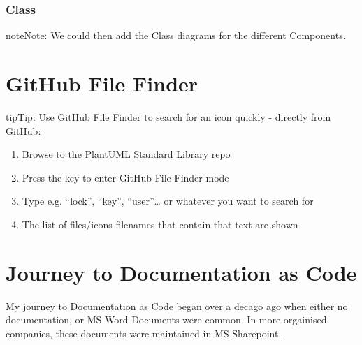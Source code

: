 \documentclass[letterpaper,10pt,english]{sphinxmanual}
\begin{document}
\subsubsection{Class}
\label{\detokenize{C4/C4Stdlib:class}}
\begin{sphinxadmonition}{note}{Note:}
We could then add the Class diagrams for the different Components.
\end{sphinxadmonition}


\section{GitHub File Finder}
\label{\detokenize{github/githubFileFinder:github-file-finder}}\label{\detokenize{github/githubFileFinder:githubfilefinder-label}}\label{\detokenize{github/githubFileFinder::doc}}
\begin{sphinxadmonition}{tip}{Tip:}
Use GitHub File Finder to search for an icon quickly - directly from GitHub:
\begin{enumerate}
%
\item {} 
Browse to the PlantUML Standard Library repo 

\item {} 
Press the  key to enter GitHub File Finder mode

\item {} 
Type e.g. “lock”, “key”, “user”… or whatever you want to search for

\item {} 
The list of files/icons filenames that contain that text are shown

\end{enumerate}

\begin{figure}[H]
\centering

\noindent{}
\end{figure}
\end{sphinxadmonition}


\section{Journey to Documentation as Code}
\label{\detokenize{DocumentationAsCode/JourneyDocumentationASCode:journey-to-documentation-as-code}}\label{\detokenize{DocumentationAsCode/JourneyDocumentationASCode:journeydoc-label}}\label{\detokenize{DocumentationAsCode/JourneyDocumentationASCode::doc}}
My journey to Documentation as Code began over a decago ago when either no documentation, or MS Word Documents were common. In more orgainised companies, these documents were maintained in MS Sharepoint.
\end{document}
